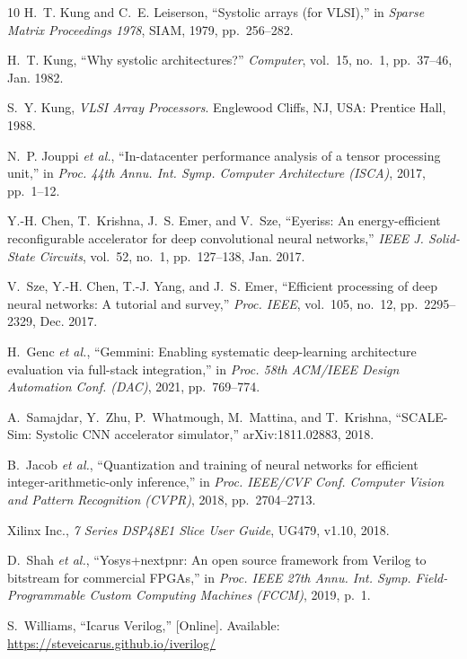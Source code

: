 \documentclass[conference]{IEEEtran}
\begin{document}
\begin{thebibliography}{10}
H.~T. Kung and C.~E. Leiserson, ``Systolic arrays (for VLSI),'' in
\emph{Sparse Matrix Proceedings 1978}, SIAM, 1979, pp.~256--282.

H.~T. Kung, ``Why systolic architectures?'' \emph{Computer}, vol.~15, no.~1,
pp.~37--46, Jan. 1982.

S.~Y. Kung, \emph{VLSI Array Processors}. Englewood Cliffs, NJ, USA:
Prentice Hall, 1988.

N.~P. Jouppi \emph{et al.}, ``In-datacenter performance analysis of a tensor
processing unit,'' in \emph{Proc. 44th Annu. Int. Symp. Computer Architecture
(ISCA)}, 2017, pp.~1--12.

Y.-H. Chen, T.~Krishna, J.~S. Emer, and V.~Sze, ``Eyeriss: An energy-efficient
reconfigurable accelerator for deep convolutional neural networks,''
\emph{IEEE J. Solid-State Circuits}, vol.~52, no.~1, pp.~127--138, Jan. 2017.

V.~Sze, Y.-H. Chen, T.-J. Yang, and J.~S. Emer, ``Efficient processing of deep
neural networks: A tutorial and survey,'' \emph{Proc. IEEE}, vol.~105, no.~12,
pp.~2295--2329, Dec. 2017.

H.~Genc \emph{et al.}, ``Gemmini: Enabling systematic deep-learning
architecture evaluation via full-stack integration,'' in \emph{Proc. 58th
ACM/IEEE Design Automation Conf. (DAC)}, 2021, pp.~769--774.

A.~Samajdar, Y.~Zhu, P.~Whatmough, M.~Mattina, and T.~Krishna, ``SCALE-Sim:
Systolic CNN accelerator simulator,'' arXiv:1811.02883, 2018.

B.~Jacob \emph{et al.}, ``Quantization and training of neural networks for
efficient integer-arithmetic-only inference,'' in \emph{Proc. IEEE/CVF Conf.
Computer Vision and Pattern Recognition (CVPR)}, 2018, pp.~2704--2713.

Xilinx Inc., \emph{7 Series DSP48E1 Slice User Guide}, UG479, v1.10, 2018.

D.~Shah \emph{et al.}, ``Yosys+nextpnr: An open source framework from Verilog
to bitstream for commercial FPGAs,'' in \emph{Proc. IEEE 27th Annu. Int. Symp.
Field-Programmable Custom Computing Machines (FCCM)}, 2019, p.~1.

S.~Williams, ``Icarus Verilog,'' [Online]. Available:
\url{https://steveicarus.github.io/iverilog/}
\end{thebibliography}
\end{document}

